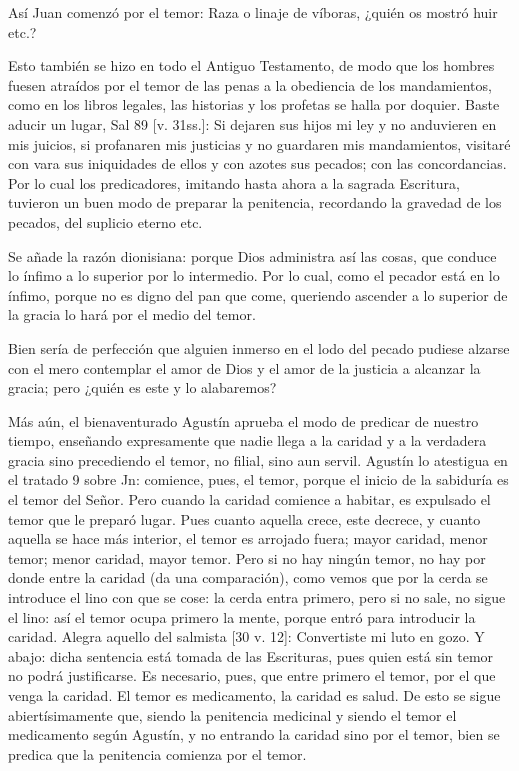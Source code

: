 Así Juan comenzó por el temor: Raza o linaje de víboras, ¿quién os mostró huir etc.?

Esto también se hizo en todo el Antiguo Testamento, de modo que los hombres fuesen atraídos por el temor de las penas a la obediencia de los mandamientos, como en los libros legales, las historias y los profetas se halla por doquier. Baste aducir un lugar, Sal 89 [v. 31ss.]: Si dejaren sus hijos mi ley y no anduvieren en mis juicios, si profanaren mis justicias y no guardaren mis mandamientos, visitaré con vara sus iniquidades de ellos y con azotes sus pecados; con las concordancias. Por lo cual los predicadores, imitando hasta ahora a la sagrada Escritura, tuvieron un buen modo de preparar la penitencia, recordando la gravedad de los pecados, del suplicio eterno etc.

Se añade la razón dionisiana: porque Dios administra así las cosas, que conduce lo ínfimo a lo superior por lo intermedio. Por lo cual, como el pecador está en lo ínfimo, porque no es digno del pan que come, queriendo ascender a lo superior de la gracia lo hará por el medio del temor.

Bien sería de perfección que alguien inmerso en el lodo \marginpar{\small[360]} del pecado pudiese alzarse con el mero contemplar el amor de Dios y el amor de la justicia a alcanzar la gracia; pero ¿quién es este y lo alabaremos?

Más aún, el bienaventurado Agustín aprueba el modo de predicar de nuestro tiempo, enseñando expresamente que nadie llega a la caridad y a la verdadera gracia sino precediendo el temor, no filial, sino aun servil. Agustín lo atestigua en el tratado 9 sobre Jn: comience, pues, el temor, porque el inicio de la sabiduría es el temor del Señor. Pero cuando la caridad comience a habitar, es expulsado el temor que le preparó lugar. Pues cuanto aquella crece, este decrece, y cuanto aquella se hace más interior, el temor es arrojado fuera; mayor caridad, menor temor; menor caridad, mayor temor. Pero si no hay ningún temor, no hay por donde entre la caridad (da una comparación), como vemos que por la cerda se introduce el lino con que se cose: la cerda entra primero, pero si no sale, no sigue el lino: así el temor ocupa primero la mente, porque entró para introducir la caridad. Alegra aquello del salmista [30 v. 12]: Convertiste mi luto en gozo. Y abajo: dicha sentencia está tomada de las Escrituras, pues quien está sin temor no podrá justificarse. Es necesario, pues, que entre primero el temor, por el que venga la caridad. El temor es medicamento, la caridad es salud. De esto se sigue abiertísimamente que, siendo la penitencia medicinal y siendo el temor el medicamento según Agustín, y no entrando la caridad sino por el temor, bien se predica que la penitencia comienza por el temor.

